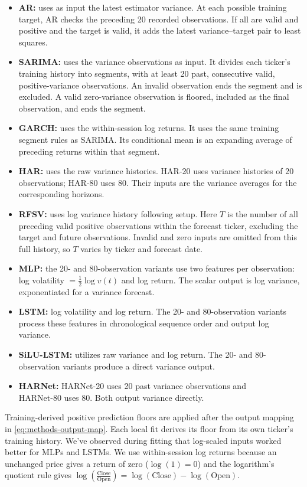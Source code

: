 \documentclass[12pt,a4paper]{article}
\numberwithin{equation}{section}
\numberwithin{table}{section}
\numberwithin{figure}{section}
\begin{document}
\begin{itemize}
    \item \textbf{AR:} uses as input the latest estimator variance. At each possible training target, AR checks the preceding 20 recorded observations. If all are valid and positive and the target is valid, it adds the latest variance–target pair to least squares.
    \item \textbf{SARIMA:} uses the variance observations as input. It divides each ticker's training history into segments, with at least 20 past, consecutive valid, positive-variance observations. An invalid observation ends the segment and is excluded. A valid zero-variance observation is floored, included as the final observation, and ends the segment.
    \item \textbf{GARCH:} uses the within-session log returns. It uses the same training segment rules as SARIMA. Its conditional mean is an expanding average of preceding returns within that segment. 
    \item \textbf{HAR:} uses the raw variance histories. HAR-20 uses variance histories of 20 observations; HAR-80 uses 80. Their inputs are the variance averages for the corresponding horizons.
    \item \textbf{RFSV:} uses log variance history following \cite{gatheral2018} setup. Here $T$ is the number of all preceding valid positive observations within the forecast ticker, excluding the target and future observations. Invalid and zero inputs are omitted from this full history, so $T$ varies by ticker and forecast date. 
    \item \textbf{MLP:} the 20- and 80-observation variants use two features per observation: log volatility $= \tfrac12\log v(t)$ and log return. The scalar output is log variance, exponentiated for a variance forecast.
    \item \textbf{LSTM:} log volatility and log return. The 20- and 80-observation variants process these features in chronological sequence order and output log variance.
    \item \textbf{SiLU-LSTM:} utilizes raw variance and log return. The 20- and 80-observation variants produce a direct variance output.
    \item \textbf{HARNet:} HARNet-20 uses 20 past variance observations and \\ HARNet-80 uses 80. Both output variance directly.
\end{itemize}
 Training-derived positive prediction floors are applied after the output mapping in \eqref{eq:methods-output-map}. Each local fit derives its floor from its own ticker's training history. We've observed during fitting that log-scaled inputs worked better for MLPs and LSTMs. We use within-session log returns because an unchanged price gives a return of zero ($\log(1) = 0$) and the logarithm's quotient rule gives $\log\left(\frac{\mathrm{Close}}{\mathrm{Open}}\right) = \log(\mathrm{Close})-\log(\mathrm{Open})$.
\end{document}

